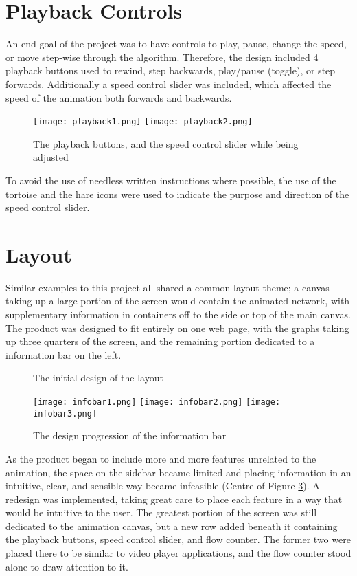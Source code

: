\documentclass{l4proj}
\begin{document}
\section{Playback Controls}
An end goal of the project was to have controls to play, pause, change the speed, or move step-wise through the algorithm. Therefore, the design included 4 playback buttons used to rewind, step backwards, play/pause (toggle), or step forwards. Additionally a speed control slider was included, which affected the speed of the animation both forwards and backwards.

\begin{figure}[h]
    \centering
    \texttt{[image: playback1.png]}
    \texttt{[image: playback2.png]}
    \caption{The playback buttons, and the speed control slider while being adjusted}
    \label{fig:my_label}
\end{figure}

To avoid the use of needless written instructions where possible, the use of the tortoise and the hare icons were used to indicate the purpose and direction of the speed control slider.

\section{Layout}
Similar examples to this project all shared a common layout theme; a canvas taking up a large portion of the screen would contain the animated network, with supplementary information in containers off to the side or top of the main canvas. The product was designed to fit entirely on one web page, with the graphs taking up three quarters of the screen, and the remaining portion dedicated to a information bar on the left.

\begin{figure}[h]
\centering
{}
\caption{The initial design of the layout}
\label{fig:early-design}
\end{figure}

\begin{figure}[h!]
    \centering
    \texttt{[image: infobar1.png]}
    \texttt{[image: infobar2.png]}
    \texttt{[image: infobar3.png]}
    \caption{The design progression of the information bar}
    \label{fig:infobar-prog}
\end{figure}

As the product began to include more and more features unrelated to the animation, the space on the sidebar became limited and placing information in an intuitive, clear, and sensible way became infeasible (Centre of Figure \ref{fig:infobar-prog}). A redesign was implemented, taking great care to place each feature in a way that would be intuitive to the user. The greatest portion of the screen was still dedicated to the animation canvas, but a new row added beneath it containing the playback buttons, speed control slider, and flow counter. The former two were placed there to be similar to video player applications, and the flow counter stood alone to draw attention to it.
\end{document}
